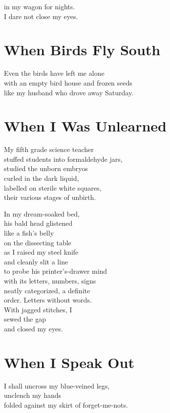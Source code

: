\documentclass[twoside,10pt]{book}
\begin{document}
in my wagon for nights.\\
I dare not close my eyes.


\clearpage
\section{When Birds Fly South}

Even the birds have left me alone\\
with an empty bird house and frozen seeds\\
like my husband who drove away Saturday.


\clearpage
\section{When I Was Unlearned}

My fifth grade science teacher\\
stuffed students into formaldehyde jars,\\
studied the unborn embryos\\
curled in the dark liquid,\\
labelled on sterile white squares,\\
their various stages of unbirth.

In my dream-soaked bed,\\
his bald head glistened\\
like a fish's belly\\
on the dissecting table\\
as I raised my steel knife\\
and cleanly slit a line\\
to probe his printer's-drawer mind\\
with its letters, numbers, signs\\
neatly categorized, a definite\\
order. Letters without words.\\
With jagged stitches, I\\
sewed the gap\\
and closed my eyes.


\clearpage
\section{When I Speak Out}

I shall uncross my blue-veined legs,\\
unclench my hands\\
folded against my skirt of forget-me-nots.
\end{document}

